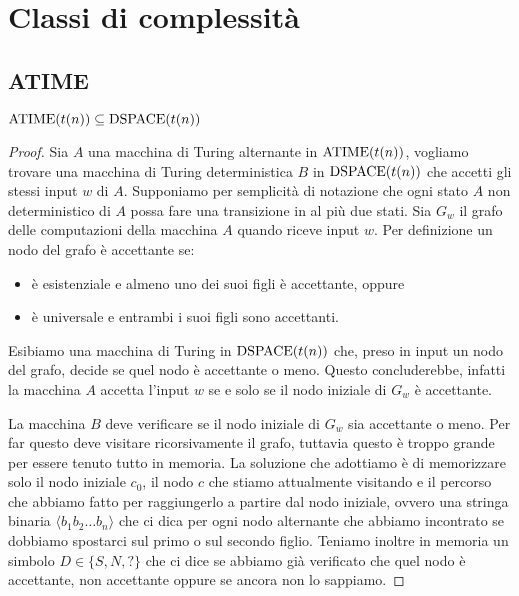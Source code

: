 \chapter{Classi di complessità}

\section{ATIME}

\begin{teorema}
 $\operatorname{ATIME}(t(n)) \subseteq \operatorname{DSPACE}(t(n))$
\end{teorema}
\begin{proof}
 Sia $A$ una macchina di Turing alternante in $\operatorname{ATIME}(t(n))$, vogliamo trovare
 una macchina di Turing deterministica $B$ in $\operatorname{DSPACE}(t(n))$ che accetti gli
 stessi input $w$ di $A$. Supponiamo per semplicità di notazione che ogni stato
 $A$ non deterministico di $A$ possa fare una transizione in al più due stati.
 Sia $G_w$ il grafo delle computazioni della macchina $A$ quando riceve input $w$.
 Per definizione un nodo del grafo è accettante se:
 \begin{itemize}
  \item è esistenziale e almeno uno dei suoi figli è accettante, oppure
  \item è universale e entrambi i suoi figli sono accettanti.
 \end{itemize}
 Esibiamo una macchina di Turing in $\operatorname{DSPACE}(t(n))$ che, preso in input un nodo
 del grafo, decide se quel nodo è accettante o meno. Questo concluderebbe, infatti
 la macchina $A$ accetta l'input $w$ se e solo se il nodo iniziale
 di $G_w$ è accettante.
 
 La macchina $B$ deve verificare se il nodo iniziale di $G_w$ sia accettante o
 meno. Per far questo deve visitare ricorsivamente il grafo, tuttavia questo
 è troppo grande per essere tenuto tutto in memoria. La soluzione che adottiamo
 è di memorizzare solo il nodo iniziale $c_0$, il nodo $c$ che stiamo attualmente
 visitando e il percorso che abbiamo fatto per raggiungerlo a partire dal nodo
 iniziale, ovvero una stringa binaria $\langle b_1 b_2 \ldots b_n \rangle$
 che ci dica per ogni nodo alternante
 che abbiamo incontrato se dobbiamo spostarci sul primo o sul secondo figlio.
 Teniamo inoltre in memoria un simbolo $D \in \{S, N, ?\}$ che ci dice se
 abbiamo già verificato che quel nodo è accettante, non accettante oppure
 se ancora non lo sappiamo.
 
 
 
 
\end{proof}

